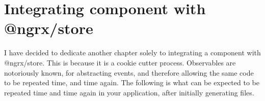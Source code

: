 \maketitle{}
\section{ Integrating component with @ngrx/store }

I have decided to dedicate another chapter solely to integrating a component
with @ngrx/store. This is because it is a cookie cutter process. Observables
are notoriously known, for abstracting events, and therefore allowing the same
code to be repeated time, and time again. The following is what can be expected
to be repeated time and time again in your application, after initially
generating files.
